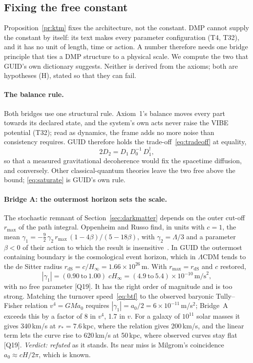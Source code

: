 \documentclass[11pt,a4paper]{article}
\theoremstyle{definition}
\theoremstyle{remark}
\newcommand{\chk}[1]{\textsf{[#1]}}
\newcommand{\tagH}{\textsf{(H)}}
\theoremstyle{definition}
\begin{document}
\subsection{Fixing the free constant}\label{sec:bridges}

Proposition~\ref{pr:ktm} fixes the architecture, not the constant. DMP cannot supply the constant by itself: its text makes every
parameter configuration (T4, T32), and it has no unit of length, time or action. A number therefore needs one bridge principle that ties a
DMP structure to a physical scale. We compute the two that GUID's own dictionary suggests. Neither is derived from the axioms; both are
hypotheses \tagH, stated so that they can fail.

\paragraph{The balance rule.} Both bridges use one structural rule. Axiom~1's balance moves every part towards its declared state, and the
system's own acts never raise the VIBE potential (T32); read as dynamics, the frame adds no more noise than consistency requires. GUID
therefore holds the trade-off~\eqref{eq:tradeoff} at equality,
\begin{equation}\label{eq:saturate}
2D_2=D_1\,D_0^{-1}\,D_1^{\dagger},
\end{equation}
so that a measured gravitational decoherence would fix the spacetime diffusion, and conversely. Other classical-quantum theories leave the
two free above the bound; \eqref{eq:saturate} is GUID's own rule.

\paragraph{Bridge A: the outermost horizon sets the scale.} The stochastic remnant of Section~\ref{sec:darkmatter} depends on the outer
cut-off $r_{\max}$ of the path integral. Oppenheim and Russo find, in units with $c=1$, the mean
$\gamma_1=-\tfrac92\,\gamma_2\,r_{\max}\,(1-4\beta)/(5-18\beta)$, with $\gamma_2=\Lambda/3$ and a parameter $\beta<0$ of their action to which
the result is insensitive~\cite{oppenheimrusso}. In GUID the outermost containing boundary is the cosmological event horizon, which in
$\Lambda$CDM tends to the de Sitter radius $r_{\text{dS}}=c/H_\infty=1.66\times10^{26}$\,m. With $r_{\max}=r_{\text{dS}}$ and $c$ restored,
\begin{equation}\label{eq:bridgeA}
|\gamma_1|=(0.90\ \text{to}\ 1.00)\;cH_\infty=(4.9\ \text{to}\ 5.4)\times10^{-10}\,\text{m/s}^2,
\end{equation}
with no free parameter \chk{Q19}. It has the right order of magnitude and is too strong. Matching the turnover speed~\eqref{eq:btf} to the
observed baryonic Tully--Fisher relation $v^4=GMa_0$ requires $|\gamma_1|=a_0/2=6\times10^{-11}$\,m/s$^2$; Bridge~A exceeds this by a factor
of 8 in $v^4$, 1.7 in $v$. For a galaxy of $10^{11}$ solar masses it gives 340\,km/s at $r_*=7.6$\,kpc, where the relation gives 200\,km/s,
and the linear term lets the curve rise to 620\,km/s at 50\,kpc, where observed curves stay flat \chk{Q19}. \emph{Verdict: refuted} as it
stands. Its near miss is Milgrom's coincidence $a_0\approx cH/2\pi$, which is known.
\end{document}
